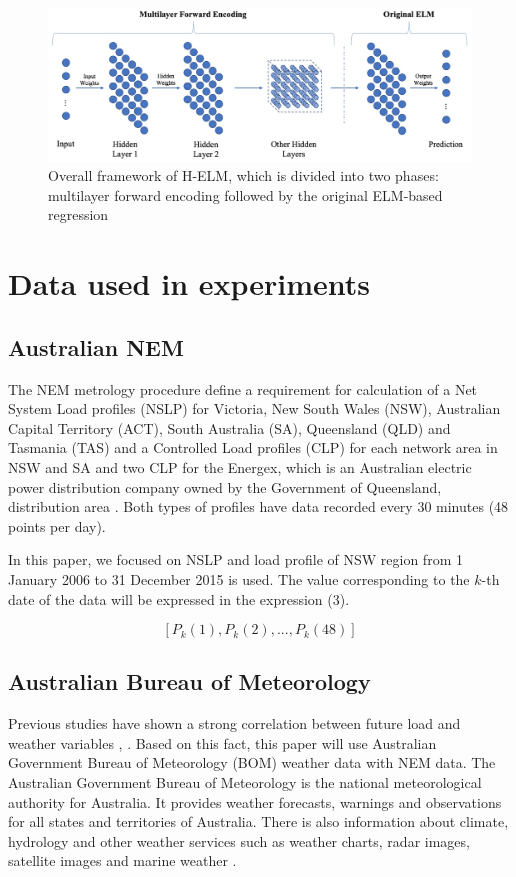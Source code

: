 \documentclass[runningheads,a4paper]{llncs}
\begin{document}
\begin{figure}
\centering
\includegraphics[width=12.1cm]{helm_figure}
\caption{Overall framework of H-ELM, which is divided into two phases:
multilayer forward encoding followed by the original ELM-based regression}
\label{fig:helm_figure}
\end{figure}

\section{Data used in experiments}

\subsection{Australian NEM}

The NEM metrology procedure define a requirement for calculation of a Net System Load profiles (NSLP) for Victoria, New South Wales (NSW), Australian Capital Territory (ACT), South Australia (SA), Queensland (QLD) and Tasmania (TAS) and a Controlled Load profiles (CLP) for each network area in NSW and SA and two CLP for the Energex, which is an Australian electric power distribution company owned by the Government of Queensland, distribution area \cite{url_nem}. Both types of profiles have data recorded every 30 minutes (48 points per day). 

In this paper, we focused on NSLP and load profile of NSW region from 1 January 2006 to 31 December 2015 is used. The value corresponding to the $ k $-th date of the data will be expressed in the expression (3).

\begin{equation}
\left [ P_{k}(1), P_{k}(2), ..., P_{k}(48) \right ]
\end{equation}


\subsection{Australian Bureau of Meteorology}

Previous studies have shown a strong correlation between future load and weather variables \cite{weather1}, \cite{weather2}. Based on this fact, this paper will use Australian Government Bureau of Meteorology (BOM) weather data with NEM data. The Australian Government Bureau of Meteorology is the national meteorological authority for Australia. It provides weather forecasts, warnings and observations for all states and territories of Australia. There is also information about climate, hydrology and other weather services such as weather charts, radar images, satellite images and marine weather \cite{url_bom}. 
\end{document}
